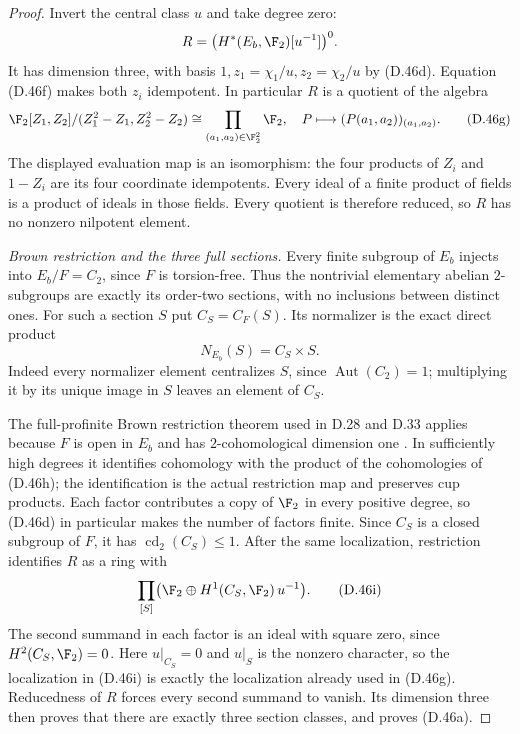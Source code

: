 \begin{proof}
Invert the central class $u$ and take degree zero:
\[
             R=\bigl(H^*(E_b,\F_2)[u^{-1}]\bigr)^0.
\]
It has dimension three, with basis
$1,z_1=\chi_1/u,z_2=\chi_2/u$ by (D.46d).
Equation (D.46f) makes both $z_i$ idempotent.
In particular $R$ is a quotient of the algebra
\[
 \F_2[Z_1,Z_2]/(Z_1^2-Z_1,Z_2^2-Z_2)
           \cong\prod_{(a_1,a_2)\in\F_2^2}\F_2,
 \quad P\longmapsto(P(a_1,a_2))_{(a_1,a_2)}.             \tag{D.46g}
\]
The displayed evaluation map is an isomorphism:
the four products of $Z_i$ and $1-Z_i$ are its four
coordinate idempotents.
Every ideal of a finite product of fields is a product
of ideals in those fields.  Every quotient is therefore
reduced, so $R$ has no nonzero nilpotent element.

\emph{Brown restriction and the three full sections.}
Every finite subgroup of $E_b$ injects into
$E_b/F=C_2$, since $F$ is torsion-free.
Thus the nontrivial elementary abelian $2$-subgroups
are exactly its order-two sections, with no inclusions
between distinct ones.
For such a section $S$ put $C_S=C_F(S)$.
Its normalizer is the exact direct product
\[
                         N_{E_b}(S)=C_S\times S.        \tag{D.46h}
\]
Indeed every normalizer element centralizes $S$, since
$\operatorname{Aut}(C_2)=1$; multiplying it by its
unique image in $S$ leaves an element of $C_S$.

The full-profinite Brown restriction theorem used in
D.28 and D.33 applies because $F$ is open in $E_b$
and has $2$-cohomological dimension one
\cite[Theorem~2 and \S1.1]{A-KochloukovaZalesskii2007}.
In sufficiently high degrees it identifies cohomology
with the product of the cohomologies of (D.46h);
the identification is the actual restriction map and
preserves cup products.
Each factor contributes a copy of $\F_2$ in every
positive degree, so (D.46d) in particular makes the
number of factors finite.
Since $C_S$ is a closed subgroup of $F$, it has
$\operatorname{cd}_2(C_S)\leq1$.
After the same localization, restriction identifies
$R$ as a ring with
\[
       \prod_{[S]}
         \bigl(\F_2\oplus H^1(C_S,\F_2)\,u^{-1}\bigr).
                                                        \tag{D.46i}
\]
The second summand in each factor is an ideal with
square zero, since $H^2(C_S,\F_2)=0$.
Here $u|_{C_S}=0$ and $u|_S$ is the nonzero
character, so the localization in (D.46i) is exactly
the localization already used in (D.46g).
Reducedness of $R$ forces every second summand to
vanish.  Its dimension three then proves that there
are exactly three section classes, and proves
(D.46a).


\end{proof}

